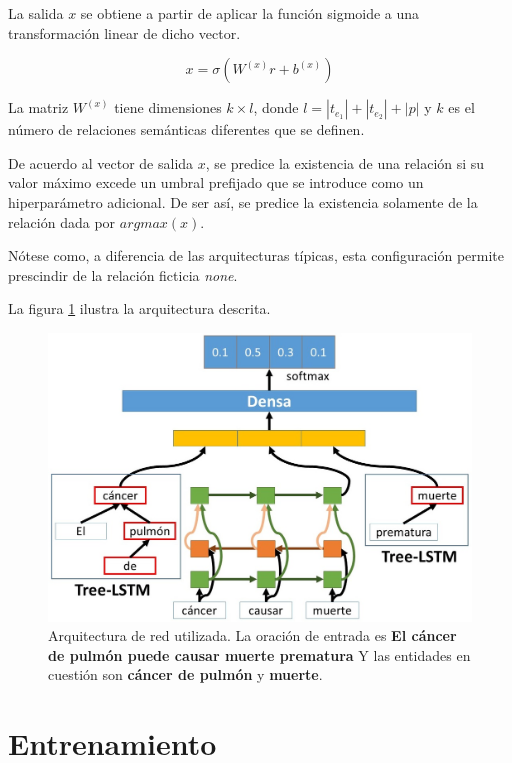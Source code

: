 La salida $x$ se obtiene a partir de aplicar la función sigmoide a una transformación linear de dicho vector.

\begin{equation*}
	x = \sigma(W^{(x)}r + b^{(x)})
\end{equation*}

La matriz $W^{(x)}$ tiene dimensiones $k \times l$, donde $l = |t_{e_1}| + |t_{e_2}| + |p|$ y $k$ es el número de relaciones semánticas diferentes que se definen.

De acuerdo al vector de salida $x$, se predice la existencia de una relación si su valor máximo excede un umbral prefijado que se introduce como un hiperparámetro adicional. De ser así, se predice la existencia solamente de la relación dada por $argmax(x)$.
	
Nótese como, a diferencia de las arquitecturas típicas, esta configuración permite prescindir de la relación ficticia \textit{none}.

La figura \ref{fig:rel_model} ilustra la arquitectura descrita.

\begin{figure}[h!]
	\centering
	\includegraphics[width=1\linewidth]{Graphics/rel_model_class.jpg}
	\caption{Arquitectura de red utilizada. La oración de entrada es \textbf{El cáncer de pulmón puede causar muerte prematura} Y las entidades en cuestión son \textbf{cáncer de pulmón} y \textbf{muerte}.}\label{fig:rel_model}
\end{figure}

\section{Entrenamiento}

